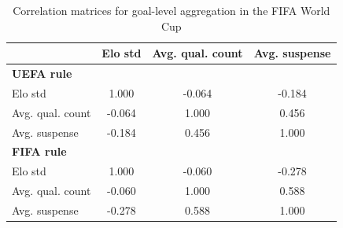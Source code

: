 \begin{table}[H]
\centering
\small
\caption{Correlation matrices for goal-level aggregation in the FIFA World Cup}
\label{tab:corr_wc}
\begin{tabular}{lccc}
\toprule
 & Elo std & Avg. qual. count & Avg. suspense \\
\midrule
\multicolumn{4}{l}{\textbf{UEFA rule}} \\
Elo std             & 1.000 & -0.064 & -0.184 \\
Avg. qual. count    & -0.064 & 1.000 & 0.456 \\
Avg. suspense       & -0.184 & 0.456 & 1.000 \\
\midrule
\multicolumn{4}{l}{\textbf{FIFA rule}} \\
Elo std             & 1.000 & -0.060 & -0.278 \\
Avg. qual. count    & -0.060 & 1.000 & 0.588 \\
Avg. suspense       & -0.278 & 0.588 & 1.000 \\
\bottomrule
\end{tabular}
\end{table}
